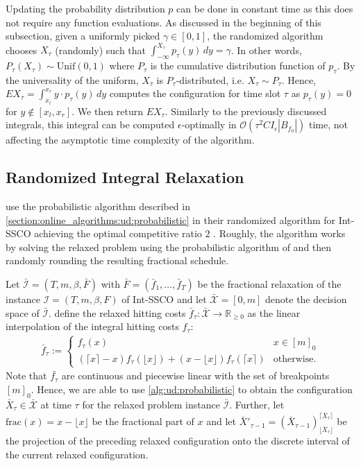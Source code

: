 Updating the probability distribution $p$ can be done in constant time as this does not require any function evaluations. As discussed in the beginning of this subsection, given a uniformly picked $\gamma \in [0,1]$, the randomized algorithm chooses $X_{\tau}$ (randomly) such that $\int_{-\infty}^{X_{\tau}} p_{\tau}(y) \,dy = \gamma$. In other words, $P_{\tau}(X_{\tau}) \sim \text{Unif}(0,1)$ where $P_{\tau}$ is the cumulative distribution function of $p_{\tau}$. By the universality of the uniform, $X_{\tau}$ is $P_{\tau}$-distributed, i.e. $X_{\tau} \sim P_{\tau}$. Hence, $E X_{\tau} = \int_{x_l}^{x_r} y \cdot p_{\tau}(y) \,dy$ computes the configuration for time slot $\tau$ as $p_{\tau}(y) = 0$ for $y \not\in [x_l, x_r]$. We then return $E X_{\tau}$. Similarly to the previously discussed integrals, this integral can be computed $\epsilon$-optimally in $\mathcal{O}(\tau^2 C I_{\epsilon} |B_{f_0}|)$ time, not affecting the asymptotic time complexity of the algorithm.

\subsection{Randomized Integral Relaxation}

\citeauthor*{Albers2018} use the probabilistic algorithm described in \autoref{section:online_algorithms:ud:probabilistic} in their randomized algorithm for Int-SSCO achieving the optimal competitive ratio $2$ \cite{Albers2018}. Roughly, the algorithm works by solving the relaxed problem using the probabilistic algorithm of \citeauthor*{Bansal2015} and then randomly rounding the resulting fractional schedule.

Let $\bar{\mathcal{I}} = (T, m, \beta, \bar{F})$ with $\bar{F} = (\bar{f}_1, \dots, \bar{f}_T)$ be the fractional relaxation of the instance $\mathcal{I} = (T, m, \beta, F)$ of Int-SSCO and let $\bar{\mathcal{X}} = [0,m]$ denote the decision space of $\bar{\mathcal{I}}$. \citeauthor*{Albers2018} define the relaxed hitting costs $\bar{f}_{\tau} : \bar{\mathcal{X}} \to \mathbb{R}_{\geq 0}$ as the linear interpolation of the integral hitting costs $f_{\tau}$: \begin{align*}
    \bar{f}_{\tau} := \begin{cases}
        f_{\tau}(x) & x \in [m]_0 \\
        (\lceil x \rceil - x) f_{\tau}(\lfloor x \rfloor) + (x - \lfloor x \rfloor) f_{\tau}(\lceil x \rceil) & \text{otherwise}.
    \end{cases}
\end{align*} Note that $\bar{f_{\tau}}$ are continuous and piecewise linear with the set of breakpoints $[m]_0$. Hence, we are able to use \autoref{alg:ud:probabilistic} to obtain the configuration $\bar{X}_{\tau} \in \bar{\mathcal{X}}$ at time $\tau$ for the relaxed problem instance  $\bar{\mathcal{I}}$. Further, let $\text{frac}(x) = x - \lfloor x \rfloor$ be the fractional part of $x$ and let $\bar{X}'_{\tau-1} = (\bar{X}_{\tau-1})_{\lfloor\bar{X}_{\tau}\rfloor}^{\lceil\bar{X}_{\tau}\rceil}$ be the projection of the preceding relaxed configuration onto the discrete interval of the current relaxed configuration.

